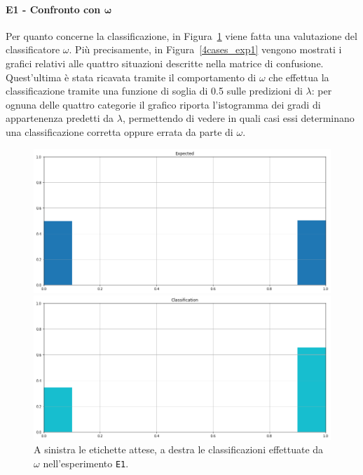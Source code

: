 \documentclass[12pt]{report}
\theoremstyle{definition}
\begin{document}
\paragraph{E1 - Confronto con $\bm{\omega}$}
Per quanto concerne la classificazione, in Figura~\ref{classification_exp1} viene fatta una valutazione del classificatore $\omega$. 
Più precisamente, in Figura~\ref{4cases_exp1} vengono mostrati i grafici relativi alle quattro situazioni descritte nella matrice di confusione. Quest'ultima è stata ricavata tramite il comportamento di $\omega$ che effettua la classificazione tramite una funzione di soglia di 0.5 sulle predizioni di $\lambda$: per ognuna delle quattro categorie il grafico riporta l'istogramma dei gradi di appartenenza predetti da $\lambda$, permettendo di vedere in quali casi essi determinano una classificazione corretta oppure errata da parte di $\omega$.
\begin{figure}
\centering
    \begin{minipage}{0.48\textwidth}
        \includegraphics[width=\linewidth]{images/experiment_uniform_disgiunti/expected_classification.png}
    \end{minipage}
    \begin{minipage}{0.48\textwidth}
        \includegraphics[width=\linewidth]{images/experiment_uniform_disgiunti/prediction_classification.png}
    \end{minipage}
    \caption{A sinistra le etichette attese, a destra le classificazioni effettuate da $\omega$ nell'esperimento \texttt{E1}.}
    \label{classification_exp1}
\end{figure}
\end{document}
